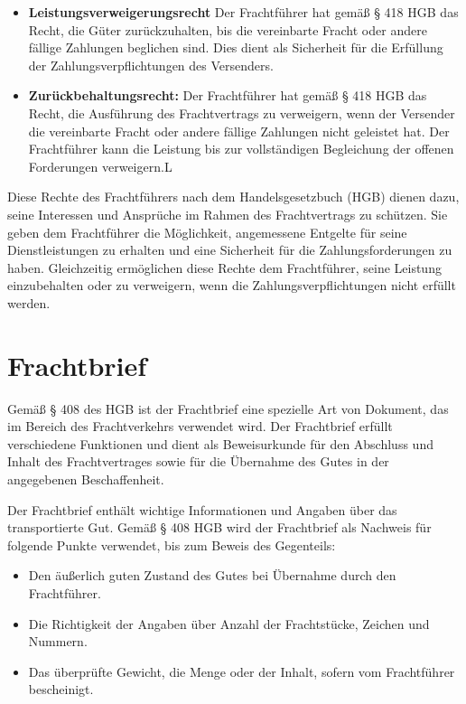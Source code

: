 \begin{itemize}
    \item \textbf{Leistungsverweigerungsrecht} Der Frachtführer hat gemäß § 418 HGB das Recht, die Güter zurückzuhalten, bis die vereinbarte Fracht oder andere fällige Zahlungen beglichen sind. Dies dient als Sicherheit für die Erfüllung der Zahlungsverpflichtungen des Versenders.
    \item \textbf{Zurückbehaltungsrecht:} Der Frachtführer hat gemäß § 418 HGB das Recht, die Ausführung des Frachtvertrags zu verweigern, wenn der Versender die vereinbarte Fracht oder andere fällige Zahlungen nicht geleistet hat. Der Frachtführer kann die Leistung bis zur vollständigen Begleichung der offenen Forderungen verweigern.L
\end{itemize}
Diese Rechte des Frachtführers nach dem Handelsgesetzbuch (HGB) dienen dazu, seine Interessen und Ansprüche im Rahmen des Frachtvertrags zu schützen. Sie geben dem Frachtführer die Möglichkeit, angemessene Entgelte für seine Dienstleistungen zu erhalten und eine Sicherheit für die Zahlungsforderungen zu haben. Gleichzeitig ermöglichen diese Rechte dem Frachtführer, seine Leistung einzubehalten oder zu verweigern, wenn die Zahlungsverpflichtungen nicht erfüllt werden.
\section{Frachtbrief}

Gemäß § 408 des \ac{HGB} ist der Frachtbrief eine spezielle Art von Dokument, das im Bereich des Frachtverkehrs verwendet wird. Der Frachtbrief erfüllt verschiedene Funktionen und dient als Beweisurkunde für den Abschluss und Inhalt des Frachtvertrages sowie für die Übernahme des Gutes in der angegebenen Beschaffenheit.

Der Frachtbrief enthält wichtige Informationen und Angaben über das transportierte Gut. Gemäß § 408 HGB wird der Frachtbrief als Nachweis für folgende Punkte verwendet, bis zum Beweis des Gegenteils:

\begin{itemize}
    \item Den äußerlich guten Zustand des Gutes bei Übernahme durch den Frachtführer.
    \item Die Richtigkeit der Angaben über Anzahl der Frachtstücke, Zeichen und Nummern.
    \item Das überprüfte Gewicht, die Menge oder der Inhalt, sofern vom Frachtführer bescheinigt.
\end{itemize}

